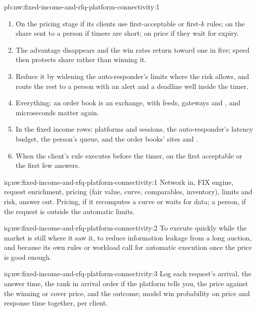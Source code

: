 \begin{solution}{pb:nw:fixed-income-and-rfq-platform-connectivity:1}
\begin{enumerate}[resume]
  times, the timer, the price model's parameters, and the rules' use.
\item On the pricing stage if its clients use first-acceptable or first-$k$ rules; on the share sent to a person if timers are short; on
  price if they wait for expiry.
\item The advantage disappears and the win rates return toward one in five; speed then protects share rather than winning it.
\item Reduce it by widening the auto-responder's limits where the risk allows, and route the rest to a person with an alert and a
  deadline well inside the timer.
\item Everything: an order book is an exchange, with feeds, gateways and , and microseconds matter again.
\item In the fixed income rows: platforms and sessions, the auto-responder's latency budget, the person's queue, and the order books'
  sites and .
\item When the client's rule executes before the timer, on the first acceptable or the first few answers.
\end{enumerate}
\end{solution}

\begin{solution}{iq:nw:fixed-income-and-rfq-platform-connectivity:1}
Network in, FIX engine, request enrichment, pricing (fair value, curve, comparables, inventory), limits and risk, answer out. Pricing,
if it recomputes a curve or waits for data; a person, if the request is outside the automatic limits.
\end{solution}

\begin{solution}{iq:nw:fixed-income-and-rfq-platform-connectivity:2}
To execute quickly while the market is still where it saw it, to reduce information leakage from a long auction, and because its own
rules or workload call for automatic execution once the price is good enough.
\end{solution}

\begin{solution}{iq:nw:fixed-income-and-rfq-platform-connectivity:3}
Log each request's arrival, the answer time, the rank in arrival order if the platform tells you, the price against the winning or cover
price, and the outcome; model win probability on price and response time together, per client.
\end{solution}

